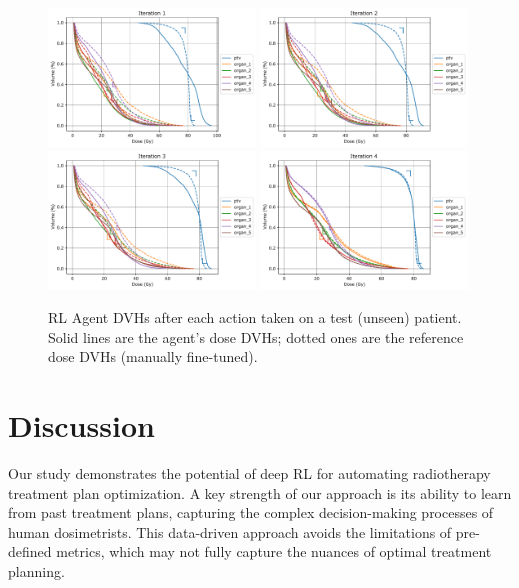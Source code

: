 \begin{figure}
	\centering
	\includegraphics[width=0.49\textwidth]{steps/distance-test-w1.pdf}	\includegraphics[width=0.49\textwidth]{steps/distance-test-w2.pdf}	\includegraphics[width=0.49\textwidth]{steps/distance-test-w3.pdf}	\includegraphics[width=0.49\textwidth]{steps/distance-test-w4.pdf}
	\caption{RL Agent DVHs after each action taken on a test (unseen) patient. Solid lines are the agent's dose DVHs; dotted ones are the reference dose DVHs (manually fine-tuned).}
	\label{fig:steps}
\end{figure}

\section{Discussion}
Our study demonstrates the potential of deep RL for automating radiotherapy treatment plan optimization.
A key strength of our approach is its ability to learn from past treatment plans, capturing the complex decision-making processes of human dosimetrists.
This data-driven approach avoids the limitations of pre-defined metrics, which may not fully capture the nuances of optimal treatment planning.

